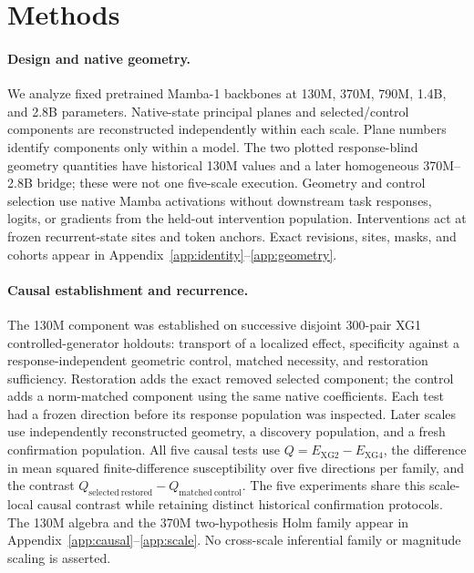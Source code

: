 \documentclass{article}
\begin{document}
\section{Methods}
\label{sec:methods}

\paragraph{Design and native geometry.}
We analyze fixed pretrained Mamba-1 backbones at 130M, 370M, 790M, 1.4B, and 2.8B parameters. Native-state principal planes and selected/control components are reconstructed independently within each scale. Plane numbers identify components only within a model. The two plotted response-blind geometry quantities have historical 130M values and a later homogeneous 370M--2.8B bridge; these were not one five-scale execution. Geometry and control selection use native Mamba activations without downstream task responses, logits, or gradients from the held-out intervention population. Interventions act at frozen recurrent-state sites and token anchors. Exact revisions, sites, masks, and cohorts appear in Appendix~\ref{app:identity}--\ref{app:geometry}.

\paragraph{Causal establishment and recurrence.}
The 130M component was established on successive disjoint 300-pair XG1 controlled-generator holdouts: transport of a localized effect, specificity against a response-independent geometric control, matched necessity, and restoration sufficiency. Restoration adds the exact removed selected component; the control adds a norm-matched component using the same native coefficients. Each test had a frozen direction before its response population was inspected. Later scales use independently reconstructed geometry, a discovery population, and a fresh confirmation population. All five causal tests use $Q=E_{\mathrm{XG2}}-E_{\mathrm{XG4}}$, the difference in mean squared finite-difference susceptibility over five directions per family, and the contrast $Q_{\mathrm{selected\ restored}}-Q_{\mathrm{matched\ control}}$. The five experiments share this scale-local causal contrast while retaining distinct historical confirmation protocols. The 130M algebra and the 370M two-hypothesis Holm family appear in Appendix~\ref{app:causal}--\ref{app:scale}. No cross-scale inferential family or magnitude scaling is asserted.
\end{document}
